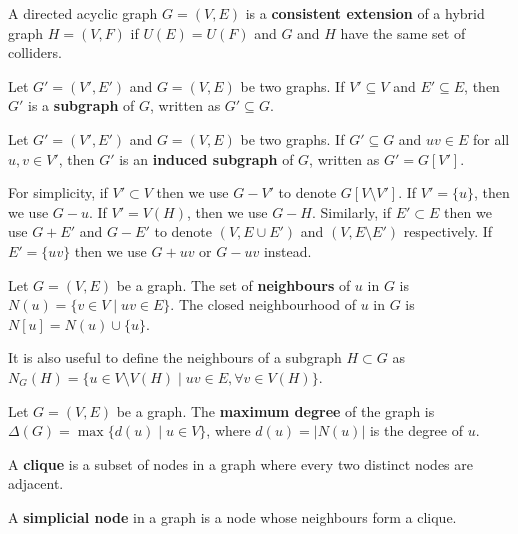 \begin{definition}
\label{def:consistent_ext}
A directed acyclic graph $G=(V,E)$ is a \textbf{consistent extension} of a hybrid graph $H=(V,F)$ if $U(E)=U(F)$ and $G$ and $H$ have the same set of colliders. 
\end{definition}

\begin{definition}
\label{def:subgraph}
Let $G'=(V',E')$ and $G=(V,E)$ be two graphs. If $V' \subseteq V$ and $E' \subseteq E$, then $G'$ is a \textbf{subgraph} of $G$, written as $G' \subseteq G$. 
\end{definition}

\begin{definition}
\label{def:induced_subgraph}
Let $G'=(V',E')$ and $G=(V,E)$ be two graphs. If $G'\subseteq G$ and $uv \in E$ for all $u,v \in V'$, then $G'$ is an \textbf{induced subgraph} of $G$, written as $G'=G[V']$.
\end{definition}
For simplicity, if $V' \subset V$ then we use $G-V'$ to denote $G[V\setminus V']$. If $V'=\{u\}$, then we use $G-u$. If $V'=V(H)$, then we use $G-H$. Similarly, if $E' \subset E$ then we use $G+E'$ and $G-E'$ to denote $(V,E \cup E')$  and $(V,E\setminus E')$ respectively. If $E' = \{uv\}$ then we use $G+uv$ or $G-uv$ instead.

\begin{definition}
Let $G=(V,E)$ be a graph. The set of \textbf{neighbours} of $u$ in $G$ is $N(u)=\{v \in V \mid uv \in E\}$. The closed neighbourhood of $u$ in $G$ is $N[u]=N(u)\cup \{u\}$.
\end{definition}
It is also useful to define the neighbours of a subgraph $H \subset G$ as $N_G(H)=\{u \in V\setminus V(H) \mid uv \in E, \forall v \in V(H)\}$.

\begin{definition}
Let $G=(V,E)$ be a graph. The \textbf{maximum degree} of the graph is $\Delta(G)=\max\{d(u) \mid u \in V\}$, where $d(u)=|N(u)|$ is the degree of $u$.
\end{definition}

\begin{definition}
A \textbf{clique} is a subset of nodes in a graph where every two distinct nodes are adjacent. 
\end{definition}

\begin{definition}
A \textbf{simplicial node} in a graph is a node whose neighbours form a clique. 
\end{definition}

